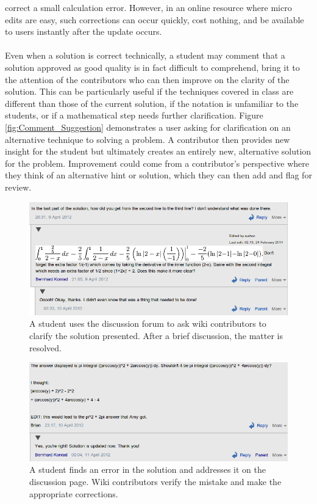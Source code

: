 \documentclass{primus}
\begin{document}
correct a small calculation error. However, in an online resource where micro edits are easy, such corrections can occur quickly, cost nothing, and be available to users instantly after the update occurs.
\\\\
\noindent{}Even when a solution is correct technically, a student may comment that a solution approved as good quality is in fact difficult to comprehend, bring it to the attention of the contributors who can then improve on the clarity of the solution.  This can be particularly useful if the techniques covered in class are different than those of the current solution, if the notation is unfamiliar to the students, or if a mathematical step needs further clarification.  Figure \ref{fig:Comment_Suggestion} demonstrates a user asking for clarification on an alternative technique to solving a problem.  A contributor then provides new insight for the student but ultimately creates an entirely new, alternative solution for the problem.  Improvement could come from a contributor's perspective where they think of an alternative hint or solution, which they can then add and flag for review.
\begin{figure}[H]
\centering
\includegraphics[width=\textwidth]{figs/Comment_Question.png}
\caption{A student uses the discussion forum to ask wiki contributors to clarify the solution presented.  After a brief discussion, the matter is resolved.}\label{fig:Comment_Question}
\end{figure}
\begin{figure}[H]
\centering
\includegraphics[width=\textwidth]{figs/Comment_Error.png}
\caption{A student finds an error in the solution and addresses it on the discussion page.  Wiki contributors verify the mistake and make the appropriate corrections.}\label{fig:Comment_Error}
\end{figure}
\end{document}
